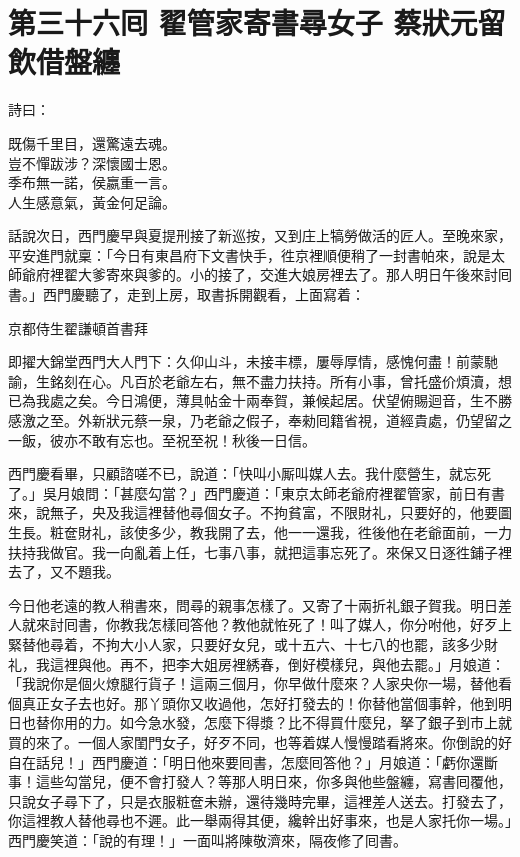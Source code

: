 
\chapter*{第三十六囘 翟管家寄書尋女子 蔡狀元留飲借盤纏}


詩曰：

\begin{myquote} 
既傷千里目，還驚遠去魂。\\豈不憚跋涉？深懷國士恩。\\季布無一諾，侯嬴重一言。\\人生感意氣，黃金何足論。
\end{myquote} 

話說次日，西門慶早與夏提刑接了新巡按，又到庄上犒勞做活的匠人。至晚來家，平安進門就稟：「今日有東昌府下文書快手，徃京裡順便稍了一封書帕來，說是太師爺府裡翟大爹寄來與爹的。小的接了，交進大娘房裡去了。那人明日午後來討囘書。」西門慶聽了，走到上房，取書拆開觀看，上面寫着：

\begin{myquote}[\markfont]
京都侍生翟謙頓首書拜

即擢大錦堂西門大人門下：久仰山斗，未接丰標，屢辱厚情，感愧何盡！前蒙馳諭，生銘刻在心。凡百於老爺左右，無不盡力扶持。所有小事，曾托盛价煩瀆，想已為我處之矣。今日鴻便，薄具帖金十兩奉賀，兼候起居。伏望俯賜迴音，生不勝感激之至。外新狀元蔡一泉，乃老爺之假子，奉勑囘籍省視，道經貴處，仍望留之一飯，彼亦不敢有忘也。至祝至祝！秋後一日信。
\end{myquote} 

西門慶看畢，只顧諮嗟不已，說道：「快叫小厮叫媒人去。我什麼營生，就忘死了。」{}吳月娘問：「甚麼勾當？」西門慶道：「東京太師老爺府裡翟管家，前日有書來，說無子，央及我這裡替他尋個女子。不拘貧富，不限財礼，只要好的，他要圖生長。粧奩財礼，該使多少，教我開了去，他一一還我，徃後他在老爺面前，一力扶持我做官。我一向亂着上任，七事八事，就把這事忘死了。來保又日逐徃鋪子裡去了，又不題我。

今日他老遠的教人稍書來，問尋的親事怎樣了。又寄了十兩折礼銀子賀我。明日差人就來討囘書，你教我怎樣囘答他？教他就恠死了！叫了媒人，你分咐他，好歹上緊替他尋着，不拘大小人家，只要好女兒，或十五六、十七八的也罷，該多少財礼，我這裡與他。再不，把李大姐房裡綉春，倒好模樣兒，與他去罷。」月娘道：「我說你是個火燎腿行貨子！這兩三個月，你早做什麼來？人家央你一場，替他看個真正女子去也好。那丫頭你又收過他，怎好打發去的！你替他當個事幹，他到明日也替你用的力。如今急水發，怎麼下得漿？比不得買什麼兒，拏了銀子到市上就買的來了。一個人家閨門女子，好歹不同，也等着媒人慢慢踏看將來。你倒說的好自在話兒！」西門慶道：「明日他來要囘書，怎麼囘答他？」月娘道：「虧你還斷事！這些勾當兒，便不會打發人？等那人明日來，你多與他些盤纏，寫書囘覆他，只說女子尋下了，只是衣服粧奩未辦，還待幾時完畢，這裡差人送去。打發去了，你這裡教人替他尋也不遲。此一舉兩得其便，纔幹出好事來，也是人家托你一場。」西門慶笑道：「說的有理！」一面叫將陳敬濟來，隔夜修了囘書。

